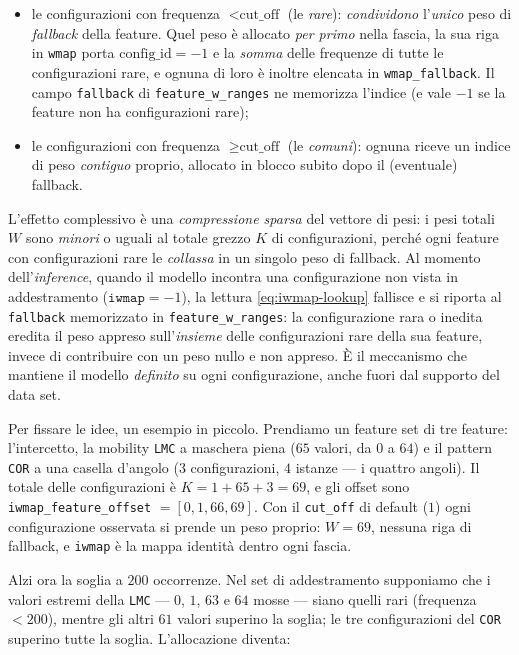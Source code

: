 \begin{itemize}
  \item le configurazioni con frequenza $< \text{cut\_off}$ (le \emph{rare}):
        \emph{condividono} l'\emph{unico} peso di \emph{fallback} della
        feature. Quel peso è allocato \emph{per primo} nella fascia, la sua
        riga in \texttt{wmap} porta $\text{config\_id} = -1$ e la
        \emph{somma} delle frequenze di tutte le configurazioni rare, e
        ognuna di loro è inoltre elencata in \texttt{wmap\_fallback}. Il
        campo \texttt{fallback} di \texttt{feature\_w\_ranges} ne memorizza
        l'indice (e vale $-1$ se la feature non ha configurazioni rare);
  \item le configurazioni con frequenza $\ge \text{cut\_off}$ (le
        \emph{comuni}): ognuna riceve un indice di peso \emph{contiguo}
        proprio, allocato in blocco subito dopo il (eventuale) fallback.
\end{itemize}

L'effetto complessivo è una \emph{compressione sparsa} del vettore di pesi:
i pesi totali $W$ sono \emph{minori} o uguali al totale grezzo $K$ di
configurazioni, perché ogni feature con configurazioni rare le
\emph{collassa} in un singolo peso di fallback. Al momento dell'\emph{inference},
quando il modello incontra una configurazione non vista in addestramento
($\texttt{iwmap} = -1$), la lettura \eqref{eq:iwmap-lookup} fallisce e si
riporta al \texttt{fallback} memorizzato in
\texttt{feature\_w\_ranges}: la configurazione rara o inedita eredita il peso
appreso sull'\emph{insieme} delle configurazioni rare della sua feature,
invece di contribuire con un peso nullo e non appreso. È il meccanismo che
mantiene il modello \emph{definito} su ogni configurazione, anche fuori
dal supporto del data set.

Per fissare le idee, un esempio in piccolo. Prendiamo un feature set di tre
feature: l'intercetto, la mobility \texttt{LMC} a maschera piena ($65$
valori, da $0$ a $64$) e il pattern \texttt{COR} a una casella d'angolo
($3$ configurazioni, $4$ istanze — i quattro angoli). Il totale delle
configurazioni è $K = 1 + 65 + 3 = 69$, e gli offset sono
\texttt{iwmap\_feature\_offset} $= [0, 1, 66, 69]$. Con il
\texttt{cut\_off} di default ($1$) ogni configurazione osservata si prende un
peso proprio: $W = 69$, nessuna riga di fallback, e \texttt{iwmap} è la
mappa identità dentro ogni fascia.

Alzi ora la soglia a $200$ occorrenze. Nel set di addestramento supponiamo
che i valori estremi della \texttt{LMC} — $0$, $1$, $63$ e $64$ mosse —
siano quelli rari (frequenza $< 200$), mentre gli altri $61$ valori
superino la soglia; le tre configurazioni del \texttt{COR} superino tutte la
soglia. L'allocazione diventa:

